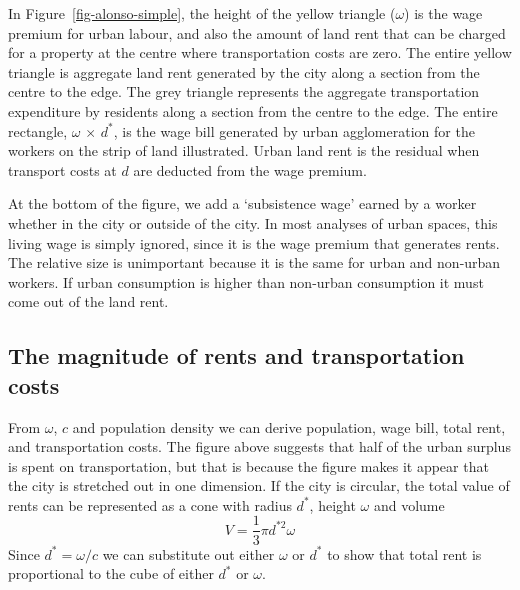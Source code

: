 In Figure~\ref{fig-alonso-simple}, the height of the yellow triangle ($\omega$) is the wage premium for urban labour, and also the amount of land rent that can be charged for a property at the centre %
where transportation costs are zero. The entire yellow triangle is aggregate land rent generated by the city along a section from the centre to the edge. 
The grey triangle represents the aggregate transportation expenditure by residents along a section from the centre to the edge. 
The entire rectangle, $\omega$ $\times$ $d^*$, is the wage bill generated by urban agglomeration for the workers on the strip of land illustrated. Urban land rent is the residual when transport costs at $d$ are deducted from the wage premium. %

At the bottom of the figure, we add a `subsistence wage'  earned by a worker whether in the city or outside of the city. In most analyses of urban spaces, this living wage is simply ignored, since it is the wage premium that generates rents.  The relative size is unimportant because it is the same for urban and non-urban workers. If urban consumption is higher than non-urban consumption it must come out of the land rent.


 \subsection{The magnitude of rents and transportation costs}
 From $\omega$, $c$ and population density we can derive population, wage bill, total rent, and transportation costs. The figure above suggests that  half of the urban surplus is spent on transportation, but that is because the figure makes it appear that the city is stretched out in one dimension. If  the city is circular, the total value of rents can be represented as  a cone with radius $d^*$, height $\omega$ and volume  \[ V=\frac{1}{3}\pi  d^{*2} \omega \]
Since $d^*=\omega/c$ we can substitute out either  $\omega$ or  $d^*$ to show that total rent is  proportional to the cube of either  $d^*$ or $\omega$. 

